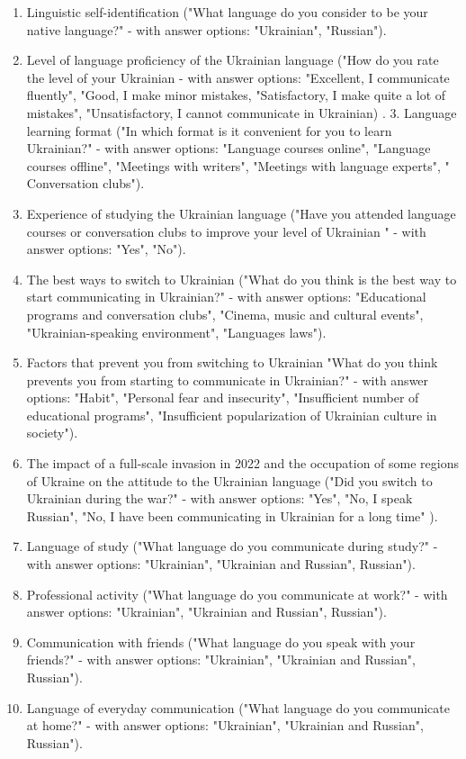 \documentclass[english]{textolivre}
\begin{document}
\begin{enumerate}
 \item Linguistic self-identification ("What language do you consider to be your native language?" - with answer options: "Ukrainian", "Russian").
 \item Level of language proficiency of the Ukrainian language ("How do you rate the level of your Ukrainian - with answer options: "Excellent, I communicate fluently", "Good, I make minor mistakes, "Satisfactory, I make quite a lot of mistakes", "Unsatisfactory, I cannot communicate in Ukrainian) . 3. Language learning format ("In which format is it convenient for you to learn Ukrainian?" - with answer options: "Language courses online", "Language courses offline", "Meetings with writers", "Meetings with language experts", " Conversation clubs").
 \item Experience of studying the Ukrainian language ("Have you attended language courses or conversation clubs to improve your level of Ukrainian " - with answer options: "Yes", "No").
 \item The best ways to switch to Ukrainian ("What do you think is the best way to start communicating in Ukrainian?" - with answer options: "Educational programs and conversation clubs", "Cinema, music and cultural events", "Ukrainian-speaking environment", "Languages laws").
 \item Factors that prevent you from switching to Ukrainian "What do you think prevents you from starting to communicate in Ukrainian?" - with answer options: "Habit", "Personal fear and insecurity", "Insufficient number of educational programs", "Insufficient popularization of Ukrainian culture in society").
 \item The impact of a full-scale invasion in 2022 and the occupation of some regions of Ukraine on the attitude to the Ukrainian language ("Did you switch to Ukrainian during the war?" - with answer options: "Yes", "No, I speak Russian", "No, I have been communicating in Ukrainian for a long time" ).
 \item Language of study ("What language do you communicate during study?" - with answer options: "Ukrainian", "Ukrainian and Russian", Russian").
 \item Professional activity ("What language do you communicate at work?" - with answer options: "Ukrainian", "Ukrainian and Russian", Russian").
 \item Communication with friends ("What language do you speak with your friends?" - with answer options: "Ukrainian", "Ukrainian and Russian", Russian").
 \item Language of everyday communication ("What language do you communicate at home?" - with answer options: "Ukrainian", "Ukrainian and Russian", Russian").
\end{enumerate}
\end{document}
